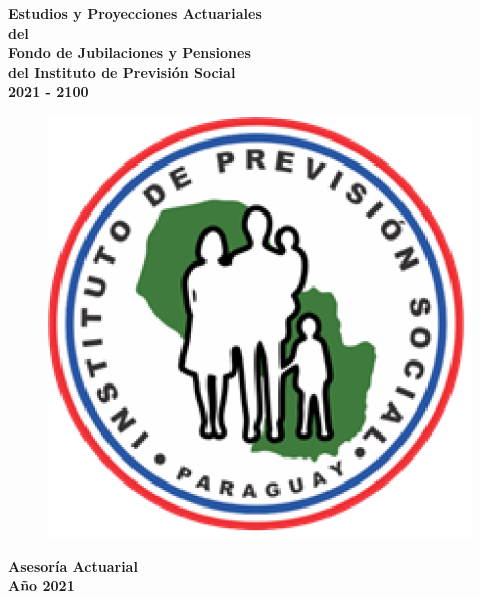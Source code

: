 \documentclass[a4paper,11pt]{article}
\begin{document}
\renewcommand{\listtablename}{\bf{Lista de Tablas}}
\renewcommand{\tablename}{\bf{Tabla}}%
\renewcommand{\figurename}{\bf{Figura}}


\newpage
\thispagestyle{empty}
\begin{center}
\LARGE\bf {Estudios y Proyecciones Actuariales}\\
\LARGE\bf {del}\\
\LARGE\bf {Fondo de Jubilaciones y Pensiones}\\
\LARGE\bf {del Instituto de Previsión Social}\\
\LARGE\bf {2021 - 2100}\\
\vspace{3cm}


\begin{figure}[h!]
\begin{center}
            \label{fig:logoIPS}
                    \includegraphics[scale=1]{logoIPS.eps}
                    \end{center}
\end{figure}


\vspace{2cm}
\LARGE\bf {Asesoría Actuarial}\\
\LARGE\bf {Año 2021}\\
\vspace{2cm}
\end{center}
\end{document}
